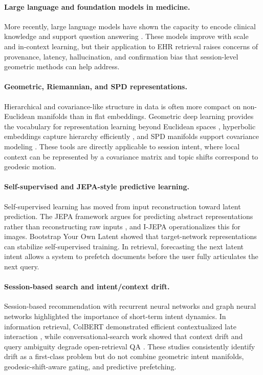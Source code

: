 \documentclass[preprint,12pt]{elsarticle}
\begin{document}
\paragraph{Large language and foundation models in medicine.} More recently, large language models have shown the capacity to encode clinical knowledge and support question answering \citep{singhal23}. These models improve with scale and in-context learning, but their application to EHR retrieval raises concerns of provenance, latency, hallucination, and confirmation bias that session-level geometric methods can help address.

\paragraph{Geometric, Riemannian, and SPD representations.} Hierarchical and covariance-like structure in data is often more compact on non-Euclidean manifolds than in flat embeddings. Geometric deep learning provides the vocabulary for representation learning beyond Euclidean spaces \citep{bronstein2017}, hyperbolic embeddings capture hierarchy efficiently \citep{nickel2017_poincare}, and SPD manifolds support covariance modeling \citep{lopez2021,zhao23}. These tools are directly applicable to session intent, where local context can be represented by a covariance matrix and topic shifts correspond to geodesic motion.

\paragraph{Self-supervised and JEPA-style predictive learning.} Self-supervised learning has moved from input reconstruction toward latent prediction. The JEPA framework argues for predicting abstract representations rather than reconstructing raw inputs \citep{lecun2022}, and I-JEPA \citep{assran2023_ijepa} operationalizes this for images. Bootstrap Your Own Latent \citep{grill20} showed that target-network representations can stabilize self-supervised training. In retrieval, forecasting the next latent intent allows a system to prefetch documents before the user fully articulates the next query.

\paragraph{Session-based search and intent/context drift.} Session-based recommendation with recurrent neural networks \citep{hidasi2015} and graph neural networks \citep{wu2019_session} highlighted the importance of short-term intent dynamics. In information retrieval, ColBERT demonstrated efficient contextualized late interaction \citep{khattab20}, while conversational-search work showed that context drift and query ambiguity degrade open-retrieval QA \citep{iyyer20,zamani20}. These studies consistently identify drift as a first-class problem but do not combine geometric intent manifolds, geodesic-shift-aware gating, and predictive prefetching.
\end{document}
